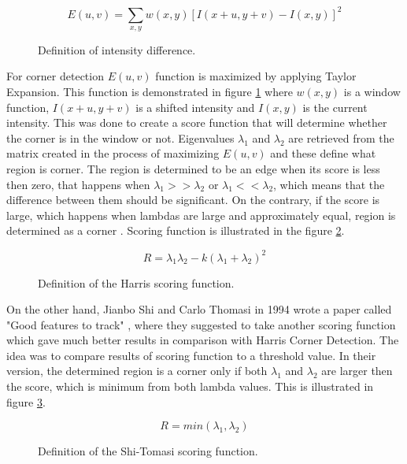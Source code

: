 \documentclass[../../../../main]{subfiles}
\begin{document}
\begin{figure} [!ht]
  \centering    
    \begin{equation}
        E(u,v) = \sum_{x,y} w(x,y) [I(x+u,y+v) - I(x,y)]^2
    \end{equation}
    \label{fig:harris_function}
  \caption{Definition of intensity difference.}
\end{figure}

For corner detection $E(u,v)$ function is maximized by applying Taylor Expansion. This function is demonstrated in figure \ref{fig:harris_function}  where $w(x,y)$ is a window function, $I(x+u,y+v)$ is a shifted intensity and $I(x,y)$ is the current intensity.  This was done to create a score function that will determine whether the corner is in the window or not. Eigenvalues $\lambda_1$ and $\lambda_2$ are retrieved from the matrix created in the process of maximizing $E(u,v)$ and these define what region is corner. The region is determined to be an edge when its score is less then zero, that happens when $\lambda_1>>\lambda_2$ or $\lambda_1<<\lambda_2$, which means that the difference between them should be significant. On the contrary, if the score is large, which happens when lambdas are large and approximately equal, region is determined as a corner \cite{opencv_docs_harris_corners_2}. Scoring function is illustrated in the figure \ref{fig:harris_scoring}.

\begin{figure} [!ht]
  \centering    
    \begin{equation}
        R = \lambda_1\lambda_2 - k(\lambda_1+\lambda_2)^2
    \end{equation}
    \label{fig:harris_scoring}
  \caption{Definition of the Harris scoring function.}
\end{figure}

On the other hand, Jianbo Shi and Carlo Thomasi in 1994 wrote a paper called "Good features to track" \cite{good_feature_to_track_shi_tomasi}, where they suggested to take another scoring function which gave much better results in comparison with Harris Corner Detection. The idea was to compare results of scoring function to a threshold value. In their version, the determined region is a corner only if both $\lambda_1$ and $\lambda_2$ are larger then the score, which is minimum from both lambda values. This is illustrated in figure \ref{fig:shi_tomasi_scoring}.

\begin{figure} [!ht]
  \centering    
    \begin{equation}
        R = min(\lambda_1,\lambda_2)
    \end{equation}
  \label{fig:shi_tomasi_scoring}
  \caption{Definition of the Shi-Tomasi scoring function.}
\end{figure}
\end{document}

